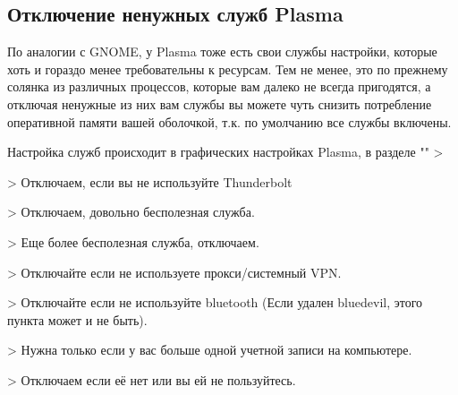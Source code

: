 \documentclass[letterpaper,10pt,russian,openany]{sphinxmanual}
\begin{document}
\ignorespaces 

\subsection{Отключение ненужных служб Plasma}
\label{\detokenize{source/de-optimizations:plasma}}\label{\detokenize{source/de-optimizations:disabling-plasma-daemons}}\label{\detokenize{source/de-optimizations:index-12}}
\sphinxAtStartPar
По аналогии с GNOME, у Plasma тоже есть свои службы настройки, которые хоть и гораздо менее требовательны к ресурсам.
Тем не менее, это по прежнему солянка из различных процессов, которые вам далеко не всегда пригодятся,
а отключая ненужные из них вам службы вы можете чуть снизить потребление оперативной памяти вашей оболочкой, т.к. по умолчанию все службы включены.

\sphinxAtStartPar
Настройка служб происходит в графических настройках Plasma, в разделе "" \sphinxhyphen{}> 

\noindent{}

\sphinxAtStartPar
{}

\sphinxAtStartPar
{} \sphinxhyphen{}> Отключаем, если вы не используйте Thunderbolt

\sphinxAtStartPar
{} \sphinxhyphen{}> Отключаем, довольно бесполезная служба.

\sphinxAtStartPar
{} \sphinxhyphen{}> Еще более бесполезная служба, отключаем.

\sphinxAtStartPar
{} \sphinxhyphen{}> Отключайте если не используете прокси/системный VPN.

\sphinxAtStartPar
{} \sphinxhyphen{}> Отключайте если не используйте bluetooth
(Если удален bluedevil, этого пункта может и не быть).

\sphinxAtStartPar
{} \sphinxhyphen{}> Нужна только если у вас больше одной учетной записи на компьютере.

\sphinxAtStartPar
{} \sphinxhyphen{}> Отключаем если её нет или вы ей не пользуйтесь.
\end{document}
